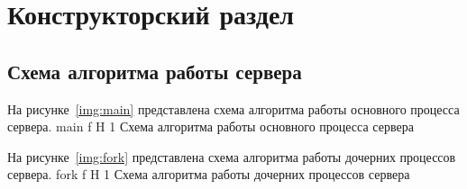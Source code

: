 \chapter{Конструкторский раздел}

\section{Схема алгоритма работы сервера}

На рисунке~\ref{img:main} представлена схема алгоритма работы основного процесса сервера.
	{main}
	{f}
	{H}
	{1\textwidth}
	{Схема алгоритма работы основного процесса сервера}
\clearpage

На рисунке~\ref{img:fork} представлена схема алгоритма работы дочерних процессов сервера.
	{fork}
	{f}
	{H}
	{1\textwidth}
	{Схема алгоритма работы дочерних процессов сервера}